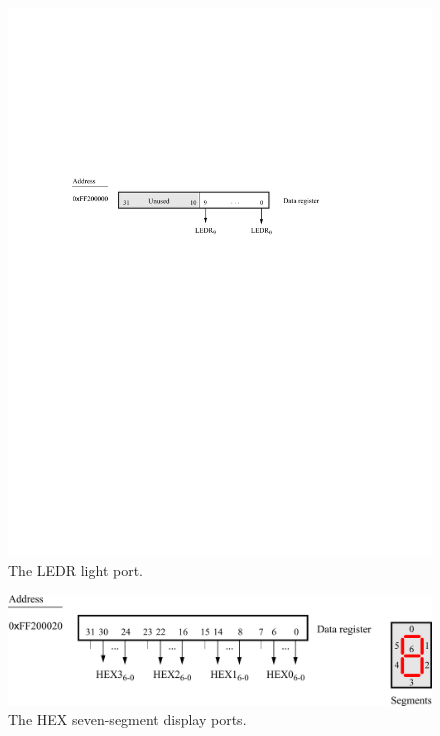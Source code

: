 \documentclass[epsfig,10pt,fullpage]{article}
\begin{document}
\begin{figure}[htb]
	\begin{center}
	\includegraphics[scale=1]{figures/fig_LED_port.pdf}
	\end{center}
	\caption{The LEDR light port.}
\label{fig:LEDR}
\end{figure}

\begin{figure}[htb]
	\begin{center}
	\includegraphics[scale=1]{figures/figureHEX.png}
	\end{center}
	\caption{The HEX seven-segment display ports.}
\label{fig:HEX}
\end{figure}
\end{document}
